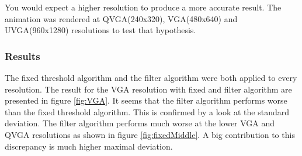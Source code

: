You would expect a higher resolution to produce a more accurate result. The animation was rendered at \gls{QVGA}(240x320), \gls{VGA}(480x640) and \gls{UVGA}(960x1280) resolutions to test that hypothesis. 
\subsubsection{Results}

The fixed threshold algorithm and the filter algorithm were both applied to every resolution. The result for the \gls{VGA} resolution with fixed and filter algorithm are presented in figure \ref{fig:VGA}. It seems that the filter algorithm performs worse than the fixed threshold algorithm. This is confirmed by a look at the standard deviation. The filter algorithm performs much worse at the lower \gls{VGA} and \gls{QVGA} resolutions as shown in figure \ref{fig:fixedMiddle}. A big contribution to this discrepancy is much higher maximal deviation. 

